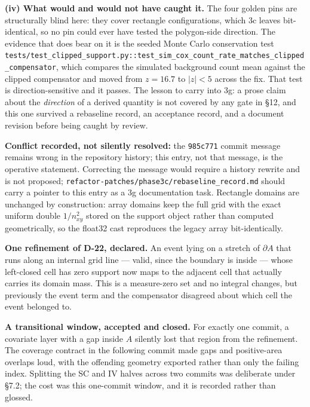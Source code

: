 \documentclass[
  10pt,
]{article}
\begin{document}
\textbf{(iv) What would and would not have caught it.} The four golden pins are structurally blind here: they cover rectangle configurations, which 3c leaves bit-identical, so no pin could ever have tested the polygon-side direction. The evidence that does bear on it is the seeded Monte Carlo conservation test \texttt{tests/\allowbreak{}test\_clipped\_\allowbreak{}support.py::\allowbreak{}test\_sim\_cox\_\allowbreak{}count\_rate\_\allowbreak{}matches\_clipped\_\allowbreak{}compensator}, which compares the simulated background count mean against the clipped compensator and moved from \(z = 16.7\) to \(|z| < 5\) across the fix. That test is direction-sensitive and it passes. The lesson to carry into 3g: a prose claim about the \emph{direction} of a derived quantity is not covered by any gate in §12, and this one survived a rebaseline record, an acceptance record, and a document revision before being caught by review.

\textbf{Conflict recorded, not silently resolved:} the \texttt{985c771} commit message remains wrong in the repository history; this entry, not that message, is the operative statement. Correcting the message would require a history rewrite and is not proposed; \texttt{refactor-patches/\allowbreak{}phase3c/\allowbreak{}rebaseline\_\allowbreak{}record.md} should carry a pointer to this entry as a 3g documentation task. Rectangle domains are unchanged by construction: array domains keep the full grid with the exact uniform double \(1/n_{xy}^2\) stored on the support object rather than computed geometrically, so the float32 cast reproduces the legacy array bit-identically.

\textbf{One refinement of D-22, declared.} An event lying on a stretch of \(\partial A\) that runs along an internal grid line --- valid, since the boundary is inside --- whose left-closed cell has zero support now maps to the adjacent cell that actually carries its domain mass. This is a measure-zero set and no integral changes, but previously the event term and the compensator disagreed about which cell the event belonged to.

\textbf{A transitional window, accepted and closed.} For exactly one commit, a covariate layer with a gap inside \(A\) silently lost that region from the refinement. The coverage contract in the following commit made gaps and positive-area overlaps loud, with the offending geometry exported rather than only the failing index. Splitting the SC and IV halves across two commits was deliberate under §7.2; the cost was this one-commit window, and it is recorded rather than glossed.
\end{document}
